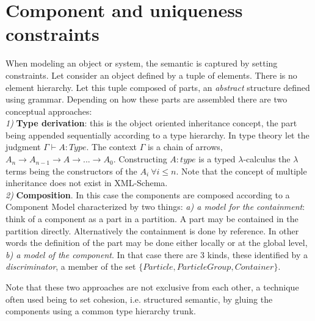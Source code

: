 \section{Component and uniqueness constraints} 
When modeling an object or system, the semantic is captured by setting constraints.
Let consider an object defined by a tuple of elements. There is no element hierarchy. 
Let this tuple composed of parts, an {\it abstract} structure defined using grammar. 
Depending on how these parts are assembled there are two conceptual approaches:\\
{\it 1)} {\bf Type derivation}: this is the object oriented inheritance concept, 
the part being appended sequentially according to a type hierarchy. In type theory 
let the judgment $\Gamma \vdash A\!:\!Type$. The context $\Gamma$ is  a chain of arrows, 
$A_n\rightarrow A_{n-1}\rightarrow A\rightarrow ...\rightarrow A_0$. Constructing $A\!:\!type$ is a typed $\lambda$-calculus
the $\lambda$ terms being the constructors of the $A_i ~\forall i\le n$.
Note that the concept of multiple inheritance does not exist in XML-Schema.\\
{\it 2)} {\bf Composition}. In this case the components are composed according to 
a Component Model characterized by two things: 
{\it a) a model for the containment}: think of a component as a part in a partition. 
A part may be contained in the partition directly. Alternatively the containment is done by reference. 
In other words the definition of the part may be done either locally or at the global level,
{\it b) a model of the component}. In that case there are 3 kinds, these identified by a {\it discriminator}, 
a member of the set $\{Particle,ParticleGroup, Container\}$. 

Note that these two approaches are not exclusive from each other, a technique often used 
being to set cohesion, i.e. structured semantic, by gluing the components using a common 
type hierarchy trunk.

